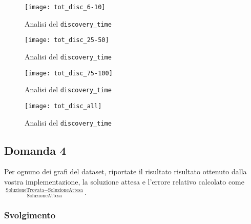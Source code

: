 \begin{figure}[H]
	\centering
	\texttt{[image: tot\_disc\_6-10]}
	\caption{Analisi del \texttt{discovery\_time}}
	\label{dt-confronto1}
\end{figure}

\begin{figure}[H]
	\centering
	\texttt{[image: tot\_disc\_25-50]}
	\caption{Analisi del \texttt{discovery\_time}}
	\label{dt-confronto2}
\end{figure}

\begin{figure}[H]
	\centering
	\texttt{[image: tot\_disc\_75-100]}
	\caption{Analisi del \texttt{discovery\_time}}
	\label{dt-confronto3}
\end{figure}

\begin{figure}[H]
	\centering
	\texttt{[image: tot\_disc\_all]}
	\caption{Analisi del \texttt{discovery\_time}}
	\label{dt-confronto4}
\end{figure}

\subsection{Domanda 4}
Per ognuno dei grafi del dataset, riportate il risultato risultato ottenuto dalla vostra implementazione, la soluzione attesa e l'errore relativo calcolato come $ \frac{\textrm{SoluzioneTrovata}-\textrm{SoluzioneAttesa}}{\textrm{SoluzioneAttesa}}$.

\subsubsection{Svolgimento}

